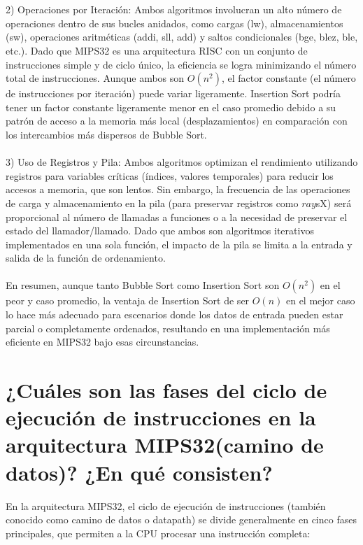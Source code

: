 \documentclass{article}
\begin{document}
\\
\\2) Operaciones por Iteración: Ambos algoritmos involucran un alto número de operaciones dentro de sus bucles anidados, como cargas (lw), almacenamientos (sw), operaciones aritméticas (addi, sll, add) y saltos condicionales (bge, blez, ble, etc.). Dado que MIPS32 es una arquitectura RISC con un conjunto de instrucciones simple y de ciclo único, la eficiencia se logra minimizando el número total de instrucciones. Aunque ambos son $O(n^2)$, el factor constante (el número de instrucciones por iteración) puede variar ligeramente. Insertion Sort podría tener un factor constante ligeramente menor en el caso promedio debido a su patrón de acceso a la memoria más local (desplazamientos) en comparación con los intercambios más dispersos de Bubble Sort.
\\
\\3) Uso de Registros y Pila: Ambos algoritmos optimizan el rendimiento utilizando registros para variables críticas (índices, valores temporales) para reducir los accesos a memoria, que son lentos. Sin embargo, la frecuencia de las operaciones de carga y almacenamiento en la pila (para preservar registros como $ra y $sX) será proporcional al número de llamadas a funciones o a la necesidad de preservar el estado del llamador/llamado. Dado que ambos son algoritmos iterativos implementados en una sola función, el impacto de la pila se limita a la entrada y salida de la función de ordenamiento.
\\
\\En resumen, aunque tanto Bubble Sort como Insertion Sort son $O(n^2)$ en el peor y caso promedio, la ventaja de Insertion Sort de ser $O(n)$ en el mejor caso lo hace más adecuado para escenarios donde los datos de entrada pueden estar parcial o completamente ordenados, resultando en una implementación más eficiente en MIPS32 bajo esas circunstancias.

\section{¿Cuáles son las fases del ciclo de ejecución de instrucciones en la arquitectura MIPS32(camino de datos)? ¿En qué consisten?}

En la arquitectura MIPS32, el ciclo de ejecución de instrucciones (también conocido como camino de datos o datapath) se divide generalmente en cinco fases principales, que permiten a la CPU procesar una instrucción completa:
\end{document}
